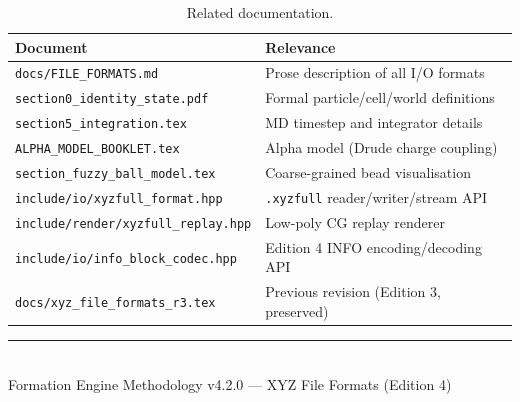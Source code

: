 \documentclass[12pt, a4paper, oneside]{article}
\newcommand{\file}[1]{\texttt{#1}}
\begin{document}
\begin{table}[htbp]
  \centering
  \caption{Related documentation.}
  \label{tab:xrefs}
  \begin{tabular}{lp{8cm}}
    \toprule
    Document & Relevance \\
    \midrule
    \file{docs/FILE\_FORMATS.md}              & Prose description of all I/O formats \\
    \file{section0\_identity\_state.pdf}       & Formal particle/cell/world definitions \\
    \file{section5\_integration.tex}           & MD timestep and integrator details \\
    \file{ALPHA\_MODEL\_BOOKLET.tex}           & Alpha model (Drude charge coupling) \\
    \file{section\_fuzzy\_ball\_model.tex}     & Coarse-grained bead visualisation \\
    \file{include/io/xyzfull\_format.hpp}      & \texttt{.xyzfull} reader/writer/stream API \\
    \file{include/render/xyzfull\_replay.hpp}  & Low-poly CG replay renderer \\
    \file{include/io/info\_block\_codec.hpp}   & Edition 4 INFO encoding/decoding API \\
    \file{docs/xyz\_file\_formats\_r3.tex}     & Previous revision (Edition 3, preserved) \\
    \bottomrule
  \end{tabular}
\end{table}

\vfill

\begin{center}
\rule{0.5\textwidth}{0.4pt}\\[6pt]
\small Formation Engine Methodology v4.2.0 --- XYZ File Formats (Edition 4)
\end{center}
\end{document}
